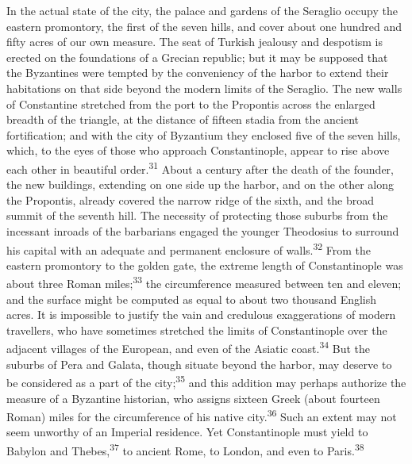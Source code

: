 In the actual state of the city, the palace and gardens of the
Seraglio occupy the eastern promontory, the first of the seven
hills, and cover about one hundred and fifty acres of our own
measure. The seat of Turkish jealousy and despotism is erected on
the foundations of a Grecian republic; but it may be supposed
that the Byzantines were tempted by the conveniency of the harbor
to extend their habitations on that side beyond the modern limits
of the Seraglio. The new walls of Constantine stretched from the
port to the Propontis across the enlarged breadth of the
triangle, at the distance of fifteen stadia from the ancient
fortification; and with the city of Byzantium they enclosed five
of the seven hills, which, to the eyes of those who approach
Constantinople, appear to rise above each other in beautiful
order.\textsuperscript{31} About a century after the death of the founder, the new
buildings, extending on one side up the harbor, and on the other
along the Propontis, already covered the narrow ridge of the
sixth, and the broad summit of the seventh hill. The necessity of
protecting those suburbs from the incessant inroads of the
barbarians engaged the younger Theodosius to surround his capital
with an adequate and permanent enclosure of walls.\textsuperscript{32} From the
eastern promontory to the golden gate, the extreme length of
Constantinople was about three Roman miles;\textsuperscript{33} the circumference
measured between ten and eleven; and the surface might be
computed as equal to about two thousand English acres. It is
impossible to justify the vain and credulous exaggerations of
modern travellers, who have sometimes stretched the limits of
Constantinople over the adjacent villages of the European, and
even of the Asiatic coast.\textsuperscript{34} But the suburbs of Pera and Galata,
though situate beyond the harbor, may deserve to be considered as
a part of the city;\textsuperscript{35} and this addition may perhaps authorize
the measure of a Byzantine historian, who assigns sixteen Greek
(about fourteen Roman) miles for the circumference of his native
city.\textsuperscript{36} Such an extent may not seem unworthy of an Imperial
residence. Yet Constantinople must yield to Babylon and Thebes,\textsuperscript{37}
to ancient Rome, to London, and even to Paris.\textsuperscript{38}


